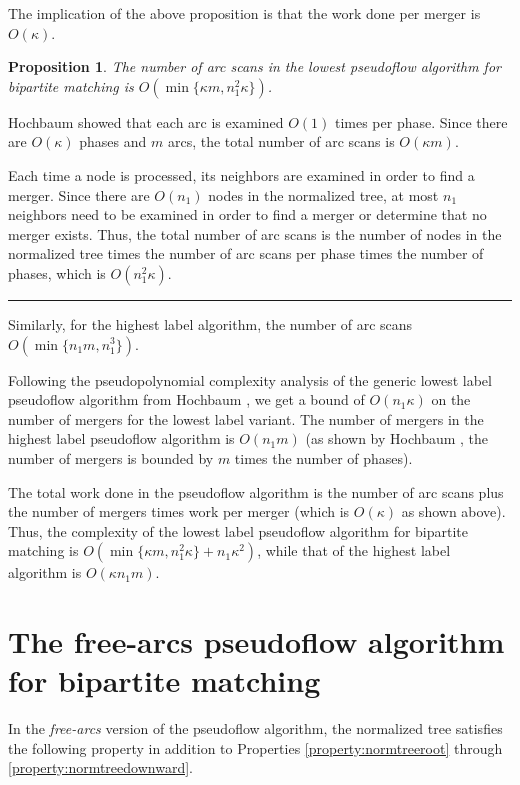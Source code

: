 \documentclass{article}
\newtheorem{proposition}{Proposition}[section]
\newenvironment{proof}[1][Proof:]{\begin{trivlist}
\item[\hskip \labelsep {\bfseries #1}]}{\end{trivlist}}
\newcommand{\qed}{\hfill \rule{2.5mm}{2.5mm}}
\begin{document}
The implication of the above proposition is that the work done per merger is $O(\kappa)$.

\begin{proposition}
The number of arc scans in the lowest pseudoflow algorithm for bipartite matching is $O(\min\{\kappa m, n_1^2 \kappa\})$.
\end{proposition}
\begin{proof}
Hochbaum \cite{Hoc97, Hoc07} showed that each arc is examined $O(1)$ times per phase.  Since there are $O(\kappa)$ phases and $m$ arcs, the total number of arc scans is $O(\kappa m)$.

Each time a node is processed, its neighbors are examined in order to find a merger.  Since there are $O(n_1)$ nodes in the normalized tree, at most $n_1$ neighbors need to be examined in order to find a merger or determine that no merger exists.  Thus, the total number of arc scans is the number of nodes in the normalized tree times the number of arc scans per phase times the number of phases, which is $O(n_1^2 \kappa)$. \qed
\end{proof}

Similarly, for the highest label algorithm, the number of arc scans $O(\min\{n_1 m, n_1^3\})$.

Following the pseudopolynomial complexity analysis of the generic lowest label pseudoflow algorithm from Hochbaum \cite{Hoc97, Hoc07}, we get a bound of $O(n_1 \kappa)$ on the number of mergers for the lowest label variant.  The number of mergers in the highest label pseudoflow algorithm is $O(n_1 m)$ (as shown by Hochbaum \cite{Hoc97, Hoc07}, the number of mergers is bounded by $m$ times the number of phases).

The total work done in the pseudoflow algorithm is the number of arc scans plus the number of mergers times work per merger (which is $O(\kappa)$ as shown above).  Thus, the complexity of the lowest label pseudoflow algorithm for bipartite matching is \mbox{$O(\min\{\kappa m, n_1^2 \kappa\} + n_1 \kappa^2)$}, while that of the highest label algorithm is $O(\kappa n_1 m)$.

\section{The free-arcs pseudoflow algorithm for bipartite matching}

In the {\em free-arcs} version of the pseudoflow algorithm, the normalized tree satisfies the following property in addition to Properties \ref{property:normtreeroot} through \ref{property:normtreedownward}.
\end{document}
